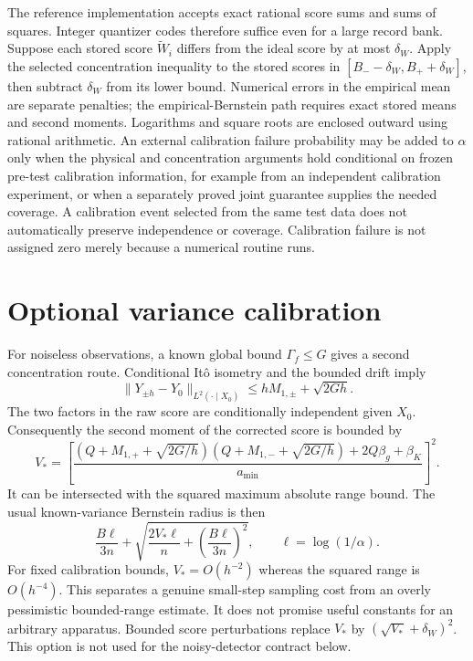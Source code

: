 The reference implementation accepts exact rational score sums and sums of
squares. Integer quantizer codes therefore suffice even for a large record
bank. Suppose each stored score $\widetilde W_i$ differs from the ideal score
by at most $\delta_W$. Apply the selected concentration inequality to the
stored scores in $[B_--\delta_W,B_++\delta_W]$, then subtract
$\delta_W$ from its lower bound. Numerical errors in the empirical mean are
separate penalties; the empirical-Bernstein path requires exact stored means
and second moments. Logarithms and square roots are enclosed outward using
rational arithmetic. An external calibration failure probability may be added to $\alpha$ only
when the physical and concentration arguments hold conditional on frozen
pre-test calibration information, for example from an independent calibration
experiment, or when a separately proved joint guarantee supplies the needed
coverage. A calibration event selected from the same test data does not
automatically preserve independence or coverage. Calibration failure is not
assigned zero merely because a numerical routine runs.

\section{Optional variance calibration}
For noiseless observations, a known global bound $\Gamma_f\le G$ gives a
second concentration route. Conditional It\^o isometry and the bounded drift
imply
\begin{equation}
 \|Y_{\pm h}-Y_0\|_{L^2(\cdot\mid X_0)}
 \le hM_{1,\pm}+\sqrt{2Gh}.
\end{equation}
The two factors in the raw score are conditionally independent given $X_0$.
Consequently the second moment of the corrected score is bounded by
\begin{equation}
 V_*=
 \left[\frac{(Q+M_{1,+}+\sqrt{2G/h})
                   (Q+M_{1,-}+\sqrt{2G/h})
                   +2Q\beta_g+\beta_K}{a_{\min}}\right]^2.
\end{equation}
It can be intersected with the squared maximum absolute range bound.
The usual known-variance Bernstein radius is then
\begin{equation}
 \frac{B\ell}{3n}+
 \sqrt{\frac{2V_*\ell}{n}+\left(\frac{B\ell}{3n}\right)^2},
 \qquad\ell=\log(1/\alpha).
\end{equation}
For fixed calibration bounds, $V_*=O(h^{-2})$ whereas the squared range is
$O(h^{-4})$. This separates a genuine small-step sampling cost from an overly
pessimistic bounded-range estimate. It does not promise useful constants for
an arbitrary apparatus. Bounded score perturbations replace $V_*$ by
$(\sqrt{V_*}+\delta_W)^2$. This option is not used for the noisy-detector
contract below.

